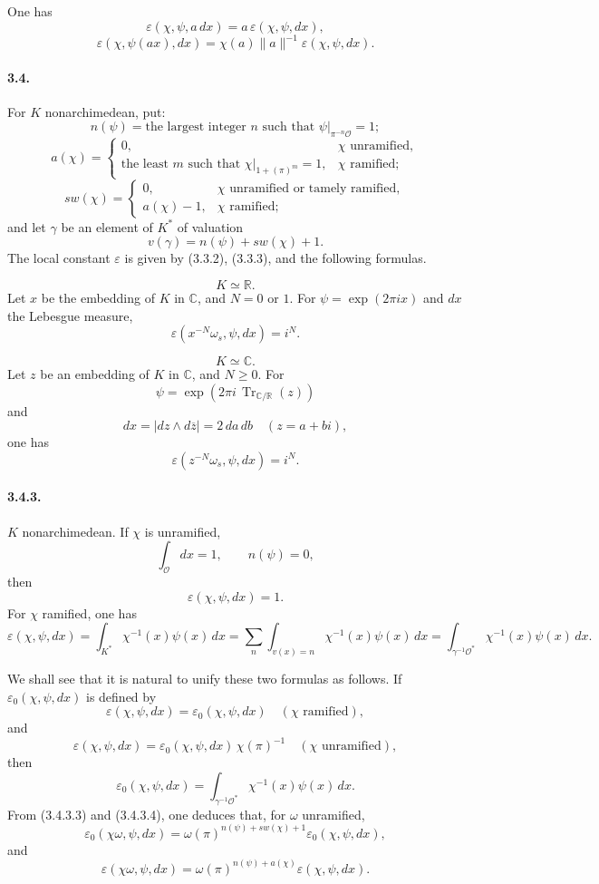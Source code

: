 \documentclass[10pt]{article}
\newcommand{\C}{\mathbb C}
\newcommand{\Tr}{\operatorname{Tr}}
\providecommand{\R}{\mathbb R}
\begin{document}
One has
\[
\tag{3.3.2}
\varepsilon(\chi,\psi,a\,dx)=a\,\varepsilon(\chi,\psi,dx),
\]
\[
\tag{3.3.3}
\varepsilon(\chi,\psi(ax),dx)=\chi(a)\|a\|^{-1}\varepsilon(\chi,\psi,dx).
\]

\paragraph{3.4.} For \(K\) nonarchimedean, put:
\[
n(\psi)=\text{the largest integer }n\text{ such that }\psi|_{\pi^{-n}\mathcal O}=1;
\]
\[
a(\chi)=
\begin{cases}
0,&\chi\text{ unramified},\\
\text{the least }m\text{ such that }\chi|_{1+(\pi)^m}=1,&\chi\text{ ramified};
\end{cases}
\]
\[
sw(\chi)=
\begin{cases}
0,&\chi\text{ unramified or tamely ramified},\\
a(\chi)-1,&\chi\text{ ramified};
\end{cases}
\]
and let \(\gamma\) be an element of \(K^*\) of valuation
\[
v(\gamma)=n(\psi)+sw(\chi)+1.
\]
The local constant \(\varepsilon\) is given by (3.3.2), (3.3.3), and the following formulas.

\[
\tag{3.4.1}
K\simeq\R.
\]
Let \(x\) be the embedding of \(K\) in \(\C\), and \(N=0\) or \(1\). For \(\psi=\exp(2\pi ix)\) and \(dx\) the Lebesgue measure,
\[
\varepsilon(x^{-N}\omega_s,\psi,dx)=i^N.
\]

\[
\tag{3.4.2}
K\simeq\C.
\]
Let \(z\) be an embedding of \(K\) in \(\C\), and \(N\ge0\). For
\[
\psi=\exp(2\pi i\,\Tr_{\C/\R}(z))
\]
and
\[
dx=|dz\wedge d\overline z|=2\,da\,db\quad(z=a+bi),
\]
one has
\[
\varepsilon(z^{-N}\omega_s,\psi,dx)=i^N.
\]

\paragraph{3.4.3.} \(K\) nonarchimedean. If \(\chi\) is unramified,
\[
\int_{\mathcal O}dx=1,\qquad n(\psi)=0,
\]
then
\[
\tag{3.4.3.1}
\varepsilon(\chi,\psi,dx)=1.
\]
For \(\chi\) ramified, one has
\[
\tag{3.4.3.2}
\varepsilon(\chi,\psi,dx)=
\int_{K^*}\chi^{-1}(x)\psi(x)\,dx
=
\sum_n\int_{v(x)=n}\chi^{-1}(x)\psi(x)\,dx
=
\int_{\gamma^{-1}\mathcal O^*}\chi^{-1}(x)\psi(x)\,dx.
\]

We shall see that it is natural to unify these two formulas as follows. If \(\varepsilon_0(\chi,\psi,dx)\) is defined by
\[
\varepsilon(\chi,\psi,dx)=\varepsilon_0(\chi,\psi,dx)
\quad(\chi\text{ ramified}),
\]
and
\[
\tag{3.4.3.3}
\varepsilon(\chi,\psi,dx)=\varepsilon_0(\chi,\psi,dx)\,\chi(\pi)^{-1}
\quad(\chi\text{ unramified}),
\]
then
\[
\tag{3.4.3.4}
\varepsilon_0(\chi,\psi,dx)=
\int_{\gamma^{-1}\mathcal O^*}\chi^{-1}(x)\psi(x)\,dx.
\]
From (3.4.3.3) and (3.4.3.4), one deduces that, for \(\omega\) unramified,
\[
\tag{3.4.3.5}
\varepsilon_0(\chi\omega,\psi,dx)
=
\omega(\pi)^{n(\psi)+sw(\chi)+1}\varepsilon_0(\chi,\psi,dx),
\]
and
\[
\varepsilon(\chi\omega,\psi,dx)
=
\omega(\pi)^{n(\psi)+a(\chi)}\varepsilon(\chi,\psi,dx).
\]
\end{document}
